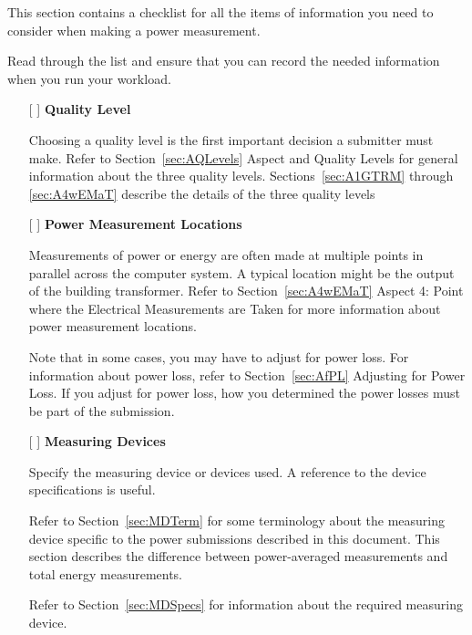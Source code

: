 \label{sec:checklist}


\noindent
This section contains a checklist for all the items of information you need 
to consider when making a power measurement. 
\wl

\noindent
Read through the list and ensure that you can record the needed 
information when you run your workload.
\wl

\begin{itemize}
\item[{[ ]}]
\textbf{Quality Level}

Choosing a quality level is the first important decision a submitter must make. Refer to 
Section~\ref{sec:AQLevels} Aspect and Quality Levels for general information about the three quality levels.  
Sections~\ref{sec:A1GTRM} through \ref{sec:A4wEMaT} describe the details of the three quality levels

\item[{[ ]}]
\textbf{Power Measurement Locations}

Measurements of power or energy are often made at multiple points in parallel across the computer system. A typical location might be the output of the building transformer.
Refer to Section~\ref{sec:A4wEMaT} Aspect 4: Point where the Electrical Measurements are Taken 
for more information about power measurement locations.

Note that in some cases, you may have to adjust for power loss. For information about power loss, refer to 
Section~\ref{sec:AfPL} Adjusting for Power Loss.  If you adjust for power loss, how you determined the power losses must be part of the submission.


\newpage

\item[{[ ]}]
\textbf{Measuring Devices}

Specify the measuring device or devices used. A reference to the device specifications is useful.

Refer to Section~\ref{sec:MDTerm} for some terminology about the measuring device specific to the power submissions described in this document. This section describes the difference between power-averaged measurements and total energy measurements.

Refer to Section~\ref{sec:MDSpecs} for information about the required measuring device.


\end{itemize}
